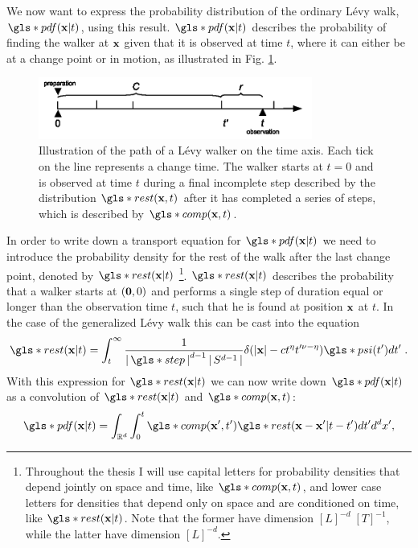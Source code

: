 We now want to express the probability distribution of the ordinary L\'evy walk, $\gls*{pdf}(\ve{x}|t)$, using this result. $\gls*{pdf}(\ve{x}|t)$ describes the probability of finding the walker at $\mathbf{ x }$ given that it is observed at time $t$, where it can either be at a change point or in motion, as illustrated in Fig. \ref{fig:pdfOrdinary}. 
%
\begin{figure}
\begin{center}
\includegraphics[width=90mm]{pics/timelineOrdinary.png}
\caption{Illustration of the path of a L\'evy walker on the time axis. Each tick on the line represents a change time. The walker starts at $t=0$ and is observed at time $t$ during a final incomplete step described by the distribution $\gls*{rest}(\ve{x},t)$ after it has completed a series of steps, which is described by $\gls*{comp}(\ve{x},t)$. 
\label{fig:pdfOrdinary}}
\end{center}
\end{figure}
%
In order to write down a transport equation for $\gls*{pdf}(\ve{x}|t)$ we need to introduce the probability density for the rest of the walk after the last change point, denoted by $\gls*{rest}(\ve{x}|t)$
\footnote{
Throughout the thesis I will use capital letters for probability densities that depend jointly on space and time, like $\gls*{comp}(\ve{x},t)$, and lower case letters for densities that depend only on space and are conditioned on time, like $\gls*{rest}(\ve{x}|t)$. Note that the former have dimension $[L]^{-d} \; [T]^{-1}$, while the latter have dimension $[L]^{-d}$.
}. 
$\gls*{rest}(\ve{x}|t)$ describes the probability that a walker starts at $(\mathbf{ 0 },0)$ and performs a single step of duration equal or longer than the observation time $t$, such that he is found at position $\mathbf{ x }$ at $t$. In the case of the generalized L\'evy walk this can be cast into the equation
%
\begin{align}
 \gls*{rest}(\ve{x}|t) =  \int_t^\infty \frac{1}{\abs{\gls*{step}}^{d-1} \abs{S^{d-1}}} \delta(|\ve{x}| - c t^{\eta}t'^{\nu-\eta}) \gls*{psi}(t') dt' \; \label{eqn:defR} .
\end{align}
%
With this expression for $\gls*{rest}(\ve{x}|t)$ we can now write down $\gls*{pdf}(\ve{x}|t)$ as a convolution of $\gls*{rest}(\ve{x}|t)$ and $\gls*{comp}(\ve{x},t)$:
%
\begin{align}
\gls*{pdf}(\ve{x}|t) = \int_{\mathbb{R}^{d}} \int_0^t  \gls*{comp}(\ve{x}',t') \gls*{rest}(\ve{x}-\ve{x}'|t-t') d t' d^{d}x' ,
\end{align}
